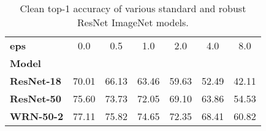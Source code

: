 \begin{table}
\centering
\caption{Clean top-1 accuracy of various standard and robust ResNet ImageNet models.}
\label{app:imagenet-resnets-accuracies}
\begin{tabular}{l|c|c|c|c|c|c}
\toprule
\textbf{eps} &   0.0 &   0.5 &   1.0 &   2.0 &   4.0 &   8.0 \\
\textbf{Model    } &       &       &       &       &       &       \\
\midrule
\textbf{ResNet-18} & 70.01 & 66.13 & 63.46 & 59.63 & 52.49 & 42.11 \\
\textbf{ResNet-50} & 75.60 & 73.73 & 72.05 & 69.10 & 63.86 & 54.53 \\
\textbf{WRN-50-2 } & 77.11 & 75.82 & 74.65 & 72.35 & 68.41 & 60.82 \\
\bottomrule
\end{tabular}
\end{table}
